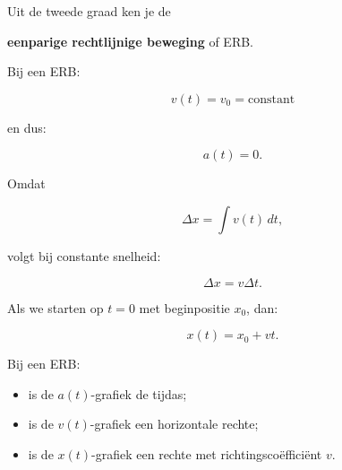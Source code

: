 \documentclass{ximera}
\begin{document}




Uit de tweede graad ken je de

\textbf{eenparige rechtlijnige beweging} of ERB.

Bij een ERB:

\[v(t)=v_0=\text{constant}\]

en dus:

\[a(t)=0.\]

Omdat

\[\Delta x=\int v(t)\,dt,\]

volgt bij constante snelheid:

\[\Delta x=v\Delta t.\]

Als we starten op $t=0$ met beginpositie $x_0$, dan:

\[\boxed{ x(t)=x_0+vt. }\]

\begin{eigenschap}

Bij een ERB:

\begin{itemize}

 \item is de $a(t)$-grafiek de tijdas;

 \item is de $v(t)$-grafiek een horizontale rechte;

 \item is de $x(t)$-grafiek een rechte met richtingscoëfficiënt $v$.

\end{itemize}

\end{eigenschap}
\end{document}
